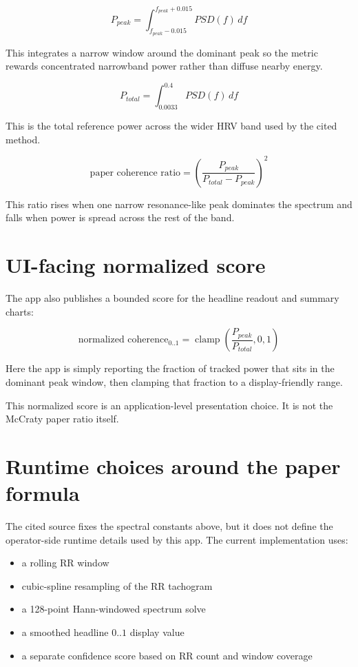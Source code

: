 \documentclass[11pt]{article}
\begin{document}
\[
P_{peak} = \int_{f_{peak} - 0.015}^{f_{peak} + 0.015} PSD(f)\,df
\]

This integrates a narrow window around the dominant peak so the metric rewards
concentrated narrowband power rather than diffuse nearby energy.

\[
P_{total} = \int_{0.0033}^{0.4} PSD(f)\,df
\]

This is the total reference power across the wider HRV band used by the cited
method.

\[
\text{paper coherence ratio} =
\left(\frac{P_{peak}}{P_{total} - P_{peak}}\right)^2
\]

This ratio rises when one narrow resonance-like peak dominates the spectrum and
falls when power is spread across the rest of the band.

\section*{UI-facing normalized score}

The app also publishes a bounded score for the headline readout and summary charts:

\[
\text{normalized coherence}_{0..1} =
\operatorname{clamp}\left(\frac{P_{peak}}{P_{total}}, 0, 1\right)
\]

Here the app is simply reporting the fraction of tracked power that sits in the
dominant peak window, then clamping that fraction to a display-friendly range.

This normalized score is an application-level presentation choice. It is not the
McCraty paper ratio itself.

\section*{Runtime choices around the paper formula}

The cited source fixes the spectral constants above, but it does not define the
operator-side runtime details used by this app. The current implementation uses:

\begin{itemize}[leftmargin=1.5em]
\item a rolling RR window
\item cubic-spline resampling of the RR tachogram
\item a 128-point Hann-windowed spectrum solve
\item a smoothed headline $0..1$ display value
\item a separate confidence score based on RR count and window coverage
\end{itemize}
\end{document}
